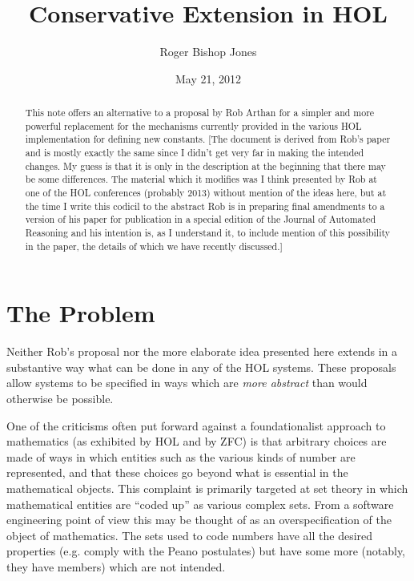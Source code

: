﻿\documentclass[12pt]{article}
\title{Conservative Extension in HOL}
\author{Roger Bishop Jones}
\date{May 21,  2012}
\begin{document}
\maketitle

\begin{abstract}
This note offers an alternative to a proposal by Rob Arthan for a simpler and more powerful replacement for the mechanisms currently provided in the various HOL implementation for defining new constants.
[The document is derived from Rob's paper and is mostly exactly the same since I didn't get very far in making the intended changes.
My guess is that it is only in the description at the beginning that there may be some differences.
The material which it modifies was I think presented by Rob at one of the HOL conferences (probably 2013) without mention of the ideas here, but at the time I write this codicil to the abstract Rob is in preparing final amendments to a version of his paper for publication in a special edition of the Journal of Automated Reasoning and his intention is, as I understand it, to include mention of this possibility in the paper, the details of which we have recently discussed.]

\end{abstract}

\section{The Problem}

Neither Rob's proposal nor the more elaborate idea presented here extends in a substantive way what can be done in any of the HOL systems.
These proposals allow systems to be specified in ways which are \emph{more abstract} than would otherwise be possible.

One of the criticisms often put forward against a foundationalist approach to mathematics (as exhibited by HOL and by ZFC) is that arbitrary choices are made of ways in which entities such as the various kinds of number are represented, and that these choices go beyond what is essential in the mathematical objects.
This complaint is primarily targeted at set theory in which mathematical entities are ``coded up'' as various complex sets.
From a software engineering point of view this may be thought of as an overspecification of the object of mathematics.
The sets used to code numbers have all the desired properties (e.g. comply with the Peano postulates) but have some more (notably, they have members) which are not intended.
\end{document}
